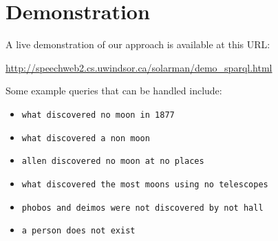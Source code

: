 \documentclass[logoontitle,tabu,supertabular,aspectratio=43]{preney-uwindsor-beamer}
\begin{document}



	\section{Demonstration}
	\begin{frame}{\insertsection}
		A live demonstration of our approach is available at this URL:
		\begin{center}
			\url{http://speechweb2.cs.uwindsor.ca/solarman/demo_sparql.html}
		\end{center}
		Some example queries that can be handled include:
		\begin{itemize}
			\item \texttt{what discovered no moon in 1877}
			\item \texttt{what discovered a non moon}
			\item \texttt{allen discovered no moon at no places}
			\item \texttt{what discovered the most moons using no telescopes}
			\item \texttt{phobos and deimos were not discovered by not hall}
			\item \texttt{a person does not exist}
		\end{itemize}
	\end{frame}
\end{document}
